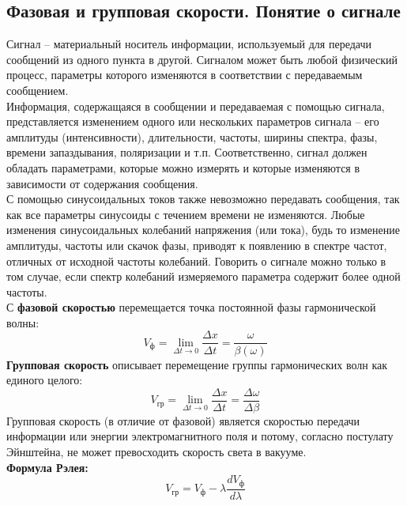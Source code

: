 \documentclass[12pt]{article}
\begin{document}
\begin{flushleft}
\subsection{Фазовая и групповая скорости. Понятие о сигнале}
Сигнал – материальный носитель информации, используемый для
передачи сообщений из одного пункта в другой. Сигналом может
быть любой физический процесс, параметры которого изменяются в
соответствии с передаваемым сообщением.\\
Информация, содержащаяся в сообщении и передаваемая с помощью сигнала, представляется
изменением одного или нескольких параметров сигнала – его амплитуды (интенсивности), длительности, частоты, ширины спектра, фазы, времени запаздывания, поляризации и т.п. Соответственно, сигнал должен обладать параметрами, которые можно измерять и которые изменяются в зависимости от содержания сообщения.\\
\vspace{0.5cm}
С помощью синусоидальных токов также невозможно передавать сообщения, так как все параметры синусоиды с течением времени не
изменяются.
Любые изменения синусоидальных колебаний напряжения (или тока), будь то изменение амплитуды, частоты или скачок фазы, приводят к появлению в
спектре частот, отличных от исходной частоты колебаний.
Говорить о сигнале
можно только в том случае, если спектр колебаний измеряемого параметра содержит более одной частоты.\\
С \textbf{фазовой скоростью} перемещается точка постоянной фазы гармонической волны:
\begin{equation}
V_{\text{ф}} = \lim_{\Delta t\to0}\frac{\Delta x}{\Delta t} = \frac{\omega}{\beta (\omega)}
\end{equation}
\textbf{Групповая скорость} описывает перемещение группы гармонических волн как единого целого:
\begin{equation}
V_{\text{гр}} = \lim_{\Delta t\to0}\frac{\Delta x}{\Delta t} = \frac{\Delta \omega}{\Delta \beta}
\end{equation}
Групповая скорость (в отличие от фазовой) является скоростью передачи информации или энергии электромагнитного поля и потому, согласно постулату Эйнштейна, не может превосходить скорость света в вакууме.\\
\textbf{Формула Рэлея:}
\begin{equation}
V_{\text{гр}} = V_{\text{ф}} - \lambda \frac{dV_{\text{ф}}}{d\lambda}
\end{equation}

\end{flushleft}
\end{document}
